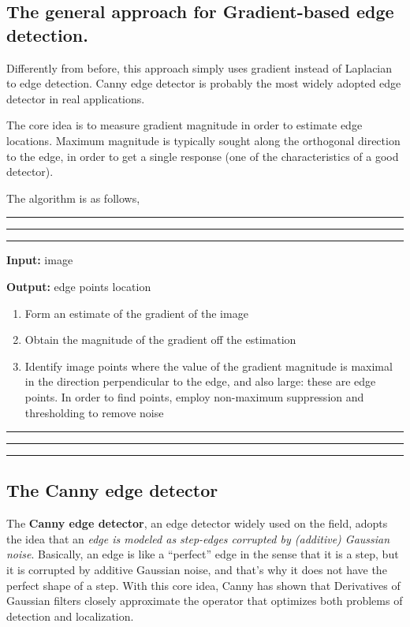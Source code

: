 \documentclass[10pt]{report}
\begin{document}
\subsection{The general approach for Gradient-based edge detection.}
\label{the-general-approach-for-gradient-based-edge-detection.}
Differently from before, this approach simply uses gradient instead of
Laplacian to edge detection. Canny edge detector is probably the most
widely adopted edge detector in real applications.

The core idea is to measure gradient magnitude in order to estimate edge
locations. Maximum magnitude is typically sought along the orthogonal
direction to the edge, in order to get a single response (one of the
characteristics of a good detector).

The algorithm is as follows,

\vspace*{0.6cm}\hrule
\hrule
\hrule
\vspace*{0.4cm}

\textbf{Input:} image

\textbf{Output:} edge points location

\begin{enumerate}
\item Form an estimate of the gradient of the image
\item Obtain the magnitude of the gradient off the estimation
\item Identify image points where the value of the gradient magnitude is maximal in the direction perpendicular to the edge, and also large: these are edge points. In order to find points, employ non-maximum suppression and thresholding to remove noise
\end{enumerate}

\vspace*{0.6cm}\hrule
\hrule
\hrule
\vspace*{0.4cm}

\subsection{The Canny edge detector}
\label{the-canny-edge-detector}
The \textbf{Canny edge detector}, an edge detector widely used on the field,
adopts the idea that an \emph{edge is modeled as step-edges corrupted by
(additive) Gaussian noise}. Basically, an edge is like a ``perfect'' edge
in the sense that it is a step, but it is corrupted by additive Gaussian
noise, and that's why it does not have the perfect shape of a step. With
this core idea, Canny has shown that Derivatives of Gaussian filters
closely approximate the operator that optimizes both problems of
detection and localization.
\end{document}
